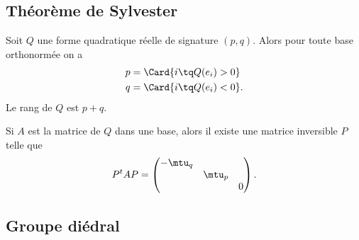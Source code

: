 \subsection{Théorème de Sylvester}


\begin{theorem}[de Sylvester]   \label{ThoQFVsBCk}
    Soit $Q$ une forme quadratique réelle de signature \( (p,q)\). Alors pour toute base orthonormée on a
    \begin{subequations}
        \begin{align}
            p&=\Card\{ i\tq Q(e_i)>0 \}\\
            q&=\Card\{ i\tq Q(e_i)<0 \}.
        \end{align}
    \end{subequations}
    Le rang de \( Q\) est \( p+q\).

    Si \( A\) est la matrice de \( Q\) dans une base, alors il existe une matrice inversible \( P\) telle que
    \begin{equation}
        P^tAP=\begin{pmatrix}
            -\mtu_q    &       &       \\
                &   \mtu_p    &       \\
                &       &   0
        \end{pmatrix}.
    \end{equation}
\end{theorem}

\subsection{Groupe diédral}
\label{subsecHibJId}

